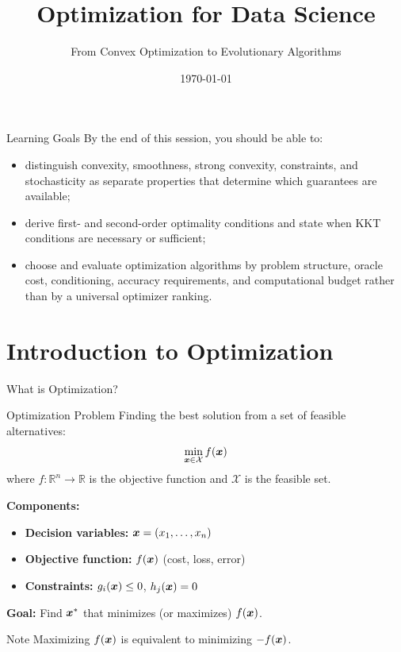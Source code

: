 \documentclass[aspectratio=169]{beamer}
\title{Optimization for Data Science}
\subtitle{From Convex Optimization to Evolutionary Algorithms}
\date{\today}
\begin{document}
\begin{frame}
  \titlepage
\end{frame}

\begin{frame}{Learning Goals}
  By the end of this session, you should be able to:
  \begin{itemize}
    \item distinguish convexity, smoothness, strong convexity, constraints, and stochasticity as separate properties that determine which guarantees are available;
    \item derive first- and second-order optimality conditions and state when KKT conditions are necessary or sufficient;
    \item choose and evaluate optimization algorithms by problem structure, oracle cost, conditioning, accuracy requirements, and computational budget rather than by a universal optimizer ranking.
  \end{itemize}
\end{frame}

\tocslide

\section{Introduction to Optimization}

\begin{frame}{What is Optimization?}
  \begin{definitionbox}{Optimization Problem}
    Finding the best solution from a set of feasible alternatives:
    $$\min_{\boldsymbol{x} \in \mathcal{X}} f(\boldsymbol{x})$$
    where $f: \mathbb{R}^n \to \mathbb{R}$ is the objective function and $\mathcal{X}$ is the feasible set.
  \end{definitionbox}

  \vspace{0.5em}

  \textbf{Components:}
  \begin{itemize}
    \item \textbf{Decision variables:} $\boldsymbol{x} = (x_1, \ldots, x_n)$
    \item \textbf{Objective function:} $f(\boldsymbol{x})$ (cost, loss, error)
    \item \textbf{Constraints:} $g_i(\boldsymbol{x}) \leq 0$, $h_j(\boldsymbol{x}) = 0$
  \end{itemize}

  \vspace{0.5em}

  \textbf{Goal:} Find $\boldsymbol{x}^*$ that minimizes (or maximizes) $f(\boldsymbol{x})$.

  \vspace{0.5em}

  \begin{alertbox}{Note}
    Maximizing $f(\boldsymbol{x})$ is equivalent to minimizing $-f(\boldsymbol{x})$.
  \end{alertbox}
\end{frame}
\end{document}
